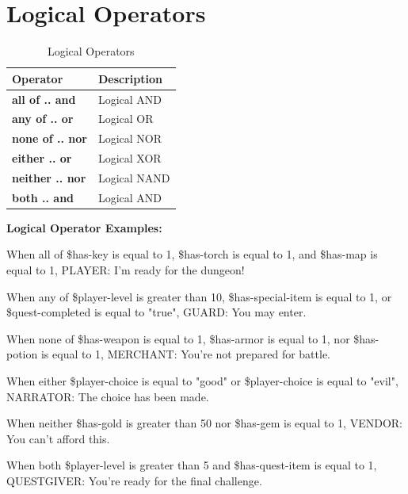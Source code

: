 \documentclass[11pt,letterpaper,oldstylefigures]{memoir}
\newcommand{\stagedir}[1]{#1\par\vspace{1\baselineskip}}
\newenvironment{FountainExample}
  {\begingroup
  \ttfamily\small
   \setlength{\parindent}{0pt}
  \setlength{\parskip}{0.5em}
  \allowdisplaybreaks
  \setlength{\displaywidowpenalty}{0}
  \setlength{\widowpenalty}{0}
  \setlength{\clubpenalty}{0}
  \setlength{\interlinepenalty}{0}
}
  {\endgroup}
\newcommand{\fountain}[1]{\textbf{#1}}
\begin{document}
\section{Logical Operators}
\begin{table}[h]
\centering
\begin{tabular}{|l|l|}
\hline
\textbf{Operator} & \textbf{Description} \\
\hline
\fountain{all of .. and} & Logical AND \\
\fountain{any of .. or} & Logical OR \\
\fountain{none of .. nor} & Logical NOR \\
\fountain{either .. or} & Logical XOR \\
\fountain{neither .. nor} & Logical NAND \\
\fountain{both .. and} & Logical AND \\
\hline
\end{tabular}
\caption{Logical Operators}
\end{table}

\textbf{Logical Operator Examples:}
\begin{FountainExample}
\stagedir{When all of \$has-key is equal to 1, \$has-torch is equal to 1, and \$has-map is equal to 1, PLAYER: I'm ready for the dungeon!}
\stagedir{When any of \$player-level is greater than 10, \$has-special-item is equal to 1, or \$quest-completed is equal to "true", GUARD: You may enter.}
\stagedir{When none of \$has-weapon is equal to 1, \$has-armor is equal to 1, nor \$has-potion is equal to 1, MERCHANT: You're not prepared for battle.}
\stagedir{When either \$player-choice is equal to "good" or \$player-choice is equal to "evil", NARRATOR: The choice has been made.}
\stagedir{When neither \$has-gold is greater than 50 nor \$has-gem is equal to 1, VENDOR: You can't afford this.}
\stagedir{When both \$player-level is greater than 5 and \$has-quest-item is equal to 1, QUESTGIVER: You're ready for the final challenge.}
\end{FountainExample}
\end{document}
